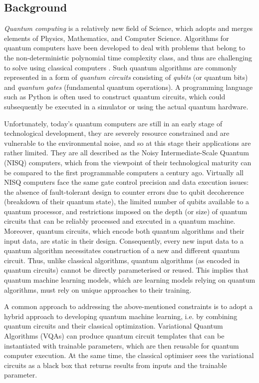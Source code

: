\subsection{Background}\label{Background Section}
\emph{Quantum computing} is a relatively new field of Science, which adopts and merges elements of Physics, Mathematics, and Computer Science. 
Algorithms for quantum computers have been developed to deal with problems that belong to the non-deterministic polynomial time complexity class, and thus are challenging to solve using classical computers \cite{williamsSolvingNPCompleteProblems2011,jiangQuantumAnnealingPrime2018,farhiQuantumApproximateOptimization2014}. 
Such quantum algorithms are commonly represented in a form of \emph{quantum circuits} consisting of \emph{qubits} (or quantum bits) and \emph{quantum gates} (fundamental quantum operations). A programming language such as Python is often used to construct quantum circuits, which could subsequently be executed in a simulator or using the actual quantum hardware. 


Unfortunately, today's quantum computers are still in an early stage of technological development, they are severely resource constrained and are vulnerable to the environmental noise, and so at this stage their applications are rather limited. 
They are all described as the Noisy Intermediate-Scale Quantum (NISQ) \cite{brooksQuantumSupremacyHunt2019} computers, which from the viewpoint of their technological maturity can be compared to the first programmable computers a century ago. 
Virtually all NISQ computers face the same gate control precision and data execution issues: the absence of fault-tolerant design to counter errors due to qubit decoherence (breakdown of their quantum state), the limited number of qubits available to a quantum processor, and restrictions imposed on the depth (or size) of quantum circuits that can be reliably processed and executed in a quantum machine. 
Moreover, quantum circuits, which encode both quantum algorithms and their input data, are static in their design. 
Consequently, every new input data to a quantum algorithm necessitates construction of a new and different quantum circuit. 
Thus, unlike classical algorithms, quantum algorithms (as encoded in quantum circuits) cannot be directly parameterised or reused. This implies that quantum machine learning models, which are learning models relying on quantum algorithms, must rely on unique approaches to their training.

A common approach to addressing the above-mentioned constraints is to adopt a hybrid approach to developing quantum machine learning, i.e. by combining quantum circuits and their classical optimization. 
Variational Quantum Algorithms (VQAs) \cite{cerezo2021variational} can produce quantum circuit templates that can be instantiated with trainable parameters, which are then reusable for quantum computer execution. 
At the same time, the classical optimiser sees the variational circuits as a black box that returns results from inputs and the trainable parameter. 


